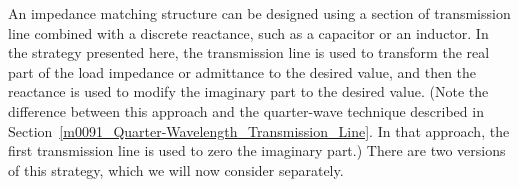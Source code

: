 

\label{m00093_Single-Reactance_Matching} %

An impedance matching structure can be designed using a section of transmission line combined with a discrete reactance, such as a capacitor or an inductor.
In the strategy presented here, the transmission line is used to transform the real part of the load impedance or admittance to the desired value, and then the reactance is used to modify the imaginary part to the desired value.
(Note the difference between this approach and the quarter-wave technique described in Section~\ref{m0091_Quarter-Wavelength_Transmission_Line}. In that approach, the first transmission line is used to zero the imaginary part.) 
There are two versions of this strategy, which we will now consider separately.

